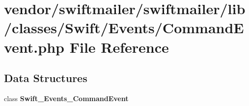 \section{vendor/swiftmailer/swiftmailer/lib/classes/\+Swift/\+Events/\+Command\+Event.php File Reference}
\label{_command_event_8php}
\subsection*{Data Structures}
\begin{DoxyCompactItemize}
\item 
class {\bf Swift\+\_\+\+Events\+\_\+\+Command\+Event}
\end{DoxyCompactItemize}
